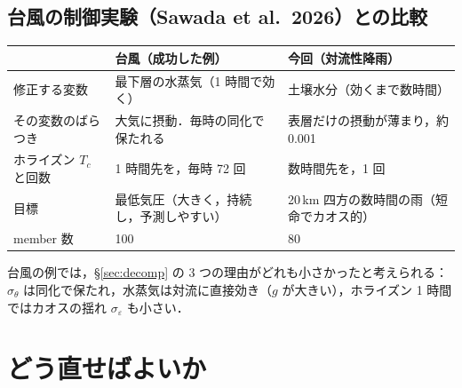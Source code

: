 \documentclass[dvipdfmx,a4paper,10.5pt]{jarticle}
\numberwithin{equation}{section}
\begin{document}
\subsection{台風の制御実験（Sawada et al.\ 2026）との比較}
\begin{center}
\begin{tabular}{lll}\toprule
 & 台風（成功した例） & 今回（対流性降雨） \\ \midrule
修正する変数 & 最下層の水蒸気（1 時間で効く） & 土壌水分（効くまで数時間） \\
その変数のばらつき & 大気に摂動．毎時の同化で保たれる & 表層だけの摂動が薄まり，約 0.001 \\
ホライズン $T_c$ と回数 & 1 時間先を，毎時 72 回 & 数時間先を，1 回 \\
目標 & 最低気圧（大きく，持続し，予測しやすい） & 20\,km 四方の数時間の雨（短命でカオス的） \\
member 数 & 100 & 80 \\ \bottomrule
\end{tabular}
\end{center}
台風の例では，\S\ref{sec:decomp} の 3 つの理由がどれも小さかったと考えられる：
$\sigma_\theta$ は同化で保たれ，水蒸気は対流に直接効き（$g$ が大きい），ホライズン 1 時間ではカオスの揺れ $\sigma_\varepsilon$ も小さい．

\section{どう直せばよいか}\label{sec:fix}
\end{document}
